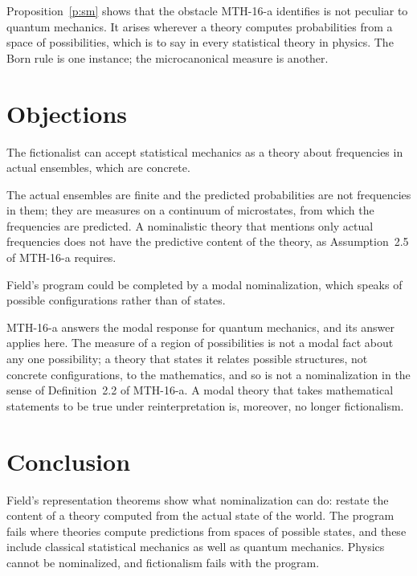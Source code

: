 \documentclass{situationist-preprint}
\begin{document}
Proposition~\ref{p:sm} shows that the obstacle MTH-16-a identifies is not peculiar to quantum mechanics. It arises wherever a theory computes probabilities from a space of possibilities, which is to say in every statistical theory in physics. The Born rule is one instance; the microcanonical measure is another.

\section{Objections}

\begin{objection}
The fictionalist can accept statistical mechanics as a theory about frequencies in actual ensembles, which are concrete.
\end{objection}

\begin{reply}
The actual ensembles are finite and the predicted probabilities are not frequencies in them; they are measures on a continuum of microstates, from which the frequencies are predicted. A nominalistic theory that mentions only actual frequencies does not have the predictive content of the theory, as Assumption~2.5 of MTH-16-a requires.
\end{reply}

\begin{objection}
Field's program could be completed by a modal nominalization, which speaks of possible configurations rather than of states.
\end{objection}

\begin{reply}
MTH-16-a answers the modal response for quantum mechanics, and its answer applies here. The measure of a region of possibilities is not a modal fact about any one possibility; a theory that states it relates possible structures, not concrete configurations, to the mathematics, and so is not a nominalization in the sense of Definition~2.2 of MTH-16-a. A modal theory that takes mathematical statements to be true under reinterpretation is, moreover, no longer fictionalism.
\end{reply}

\section{Conclusion}

Field's representation theorems show what nominalization can do: restate the content of a theory computed from the actual state of the world. The program fails where theories compute predictions from spaces of possible states, and these include classical statistical mechanics as well as quantum mechanics. Physics cannot be nominalized, and fictionalism fails with the program.
\end{document}
